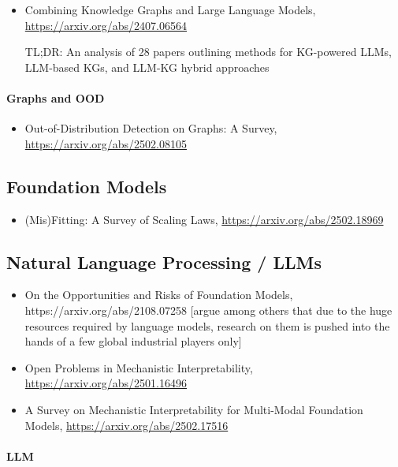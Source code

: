 \begin{itemize}
\item Combining Knowledge Graphs and Large Language Models, \url{https://arxiv.org/abs/2407.06564}

TL;DR: An analysis of 28 papers outlining methods for KG-powered LLMs, LLM-based KGs, and LLM-KG hybrid approaches
\end{itemize}

\paragraph{Graphs and OOD}

\begin{itemize}
\item Out-of-Distribution Detection on Graphs: A Survey,
\url{https://arxiv.org/abs/2502.08105}
\end{itemize}


\subsection{Foundation Models}

\begin{itemize}
\item \New (Mis)Fitting: A Survey of Scaling Laws, \url{https://arxiv.org/abs/2502.18969}
\end{itemize}

\subsection{Natural Language Processing / LLMs}

\begin{itemize}
\item On the Opportunities and Risks of Foundation Models, https://arxiv.org/abs/2108.07258 [argue among others that due to the huge resources required by language models, research on them is pushed into the hands of a few global industrial players only]

\item \New Open Problems in Mechanistic Interpretability, \url{https://arxiv.org/abs/2501.16496}

\item \New A Survey on Mechanistic Interpretability for Multi-Modal Foundation Models, \url{https://arxiv.org/abs/2502.17516}
\end{itemize}

\paragraph{LLM}

